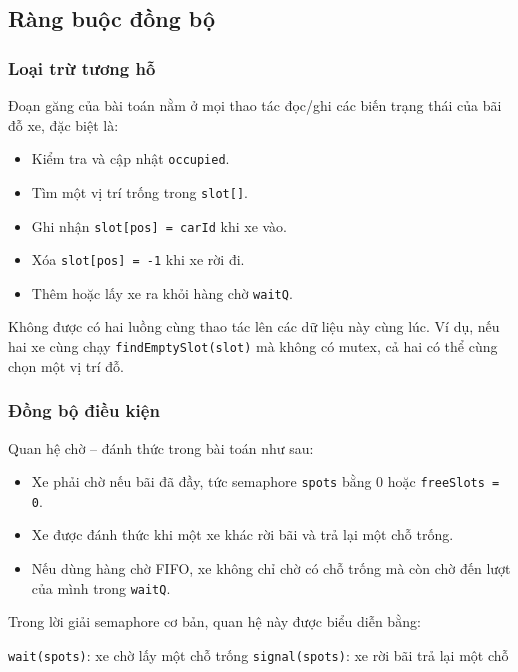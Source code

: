 
\subsection{Ràng buộc đồng bộ}

\subsubsection*{Loại trừ tương hỗ}

Đoạn găng của bài toán nằm ở mọi thao tác đọc/ghi các biến trạng thái của
bãi đỗ xe, đặc biệt là:

\begin{itemize}
    \item Kiểm tra và cập nhật \texttt{occupied}.
    \item Tìm một vị trí trống trong \texttt{slot[]}.
    \item Ghi nhận \texttt{slot[pos] = carId} khi xe vào.
    \item Xóa \texttt{slot[pos] = -1} khi xe rời đi.
    \item Thêm hoặc lấy xe ra khỏi hàng chờ \texttt{waitQ}.
\end{itemize}

Không được có hai luồng cùng thao tác lên các dữ liệu này cùng lúc. Ví dụ,
nếu hai xe cùng chạy \texttt{findEmptySlot(slot)} mà không có mutex, cả hai
có thể cùng chọn một vị trí đỗ.

\subsubsection*{Đồng bộ điều kiện}

Quan hệ chờ -- đánh thức trong bài toán như sau:

\begin{itemize}
    \item Xe phải chờ nếu bãi đã đầy, tức semaphore \texttt{spots} bằng 0 hoặc \texttt{freeSlots = 0}.
    \item Xe được đánh thức khi một xe khác rời bãi và trả lại một chỗ trống.
    \item Nếu dùng hàng chờ FIFO, xe không chỉ chờ có chỗ trống mà còn chờ đến lượt của mình trong \texttt{waitQ}.
\end{itemize}

Trong lời giải semaphore cơ bản, quan hệ này được biểu diễn bằng:

\begin{center}
\texttt{wait(spots)}: xe chờ lấy một chỗ trống
\qquad
\texttt{signal(spots)}: xe rời bãi trả lại một chỗ
\end{center}

